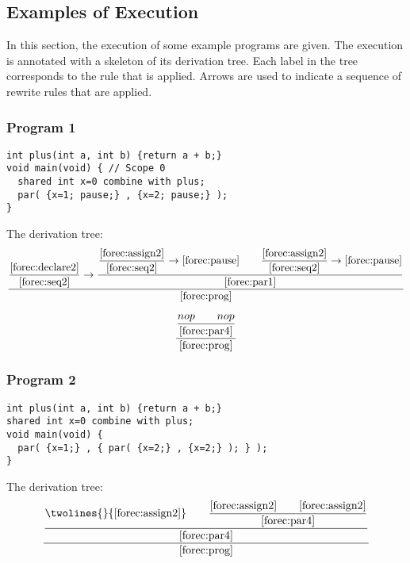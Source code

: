 
\subsection{Examples of Execution}
In this section, the execution of some example programs are given.
The execution is annotated with a skeleton of its derivation tree. 
Each label in the tree corresponds to the rule that is applied. 
Arrows are used to indicate a sequence of rewrite rules that are applied.

\subsubsection{Program 1}
\begin{lstlisting}[style=snippet]
int plus(int a, int b) {return a + b;}
void main(void) { // Scope 0
  shared int x=0 combine with plus;
  par( {x=1; pause;} , {x=2; pause;} );
}
\end{lstlisting}
The derivation tree:
\begin{equation*}
	\frac{
		\dfrac{
				\ref{forec:declare2}
			}{
				\ref{forec:seq2}
			}
			\rightarrow
		\dfrac{
				\dfrac{
					\ref{forec:assign2}
				}{
					\ref{forec:seq2}
				}
				\rightarrow
				\ref{forec:pause}
				\qquad
				\dfrac{
					\ref{forec:assign2}
				}{
					\ref{forec:seq2}
				}
				\rightarrow
				\ref{forec:pause}
			}{
				\ref{forec:par1}
			}
		}{
			\ref{forec:prog}
		}
\end{equation*}

\begin{equation*}
	\frac{
		\dfrac{
				nop
				\qquad
				nop
			}{
				\ref{forec:par4}
			}
		}{
			\ref{forec:prog}
		}
\end{equation*}

\subsubsection{Program 2}
\begin{lstlisting}[style=snippet]
int plus(int a, int b) {return a + b;}
shared int x=0 combine with plus;
void main(void) {
  par( {x=1;} , { par( {x=2;} , {x=2;} ); } );
}
\end{lstlisting}
The derivation tree:
\begin{equation*}
	\frac{
		\dfrac{
			\twolines{
				}{
					\ref{forec:assign2}
				}
				\qquad
				\dfrac{
					\ref{forec:assign2}
					\qquad
					\ref{forec:assign2}
				}{
					\ref{forec:par4}
				}
			}{
				\ref{forec:par4}
			}
		}{
			\ref{forec:prog}
		}
\end{equation*}


